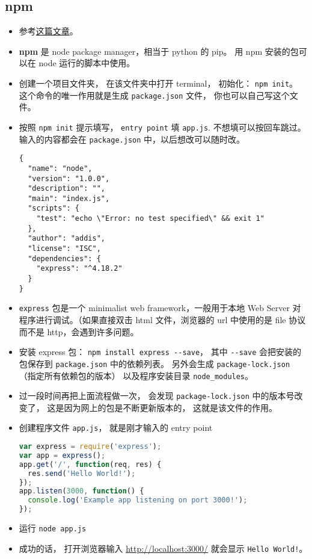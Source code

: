 \subsection{npm}
\begin{itemize}
\item 参考\href{https://medium.com/@adnanrahic/hello-world-app-with-node-js-and-express-c1eb7cfa8a30}{这篇文章}。
\item \textbf{npm} 是 node package manager，相当于 python 的 pip。 用 npm 安装的包可以在 node 运行的脚本中使用。
\item 创建一个项目文件夹， 在该文件夹中打开 terminal， 初始化： \verb|npm init|。 这个命令的唯一作用就是生成 \verb`package.json` 文件， 你也可以自己写这个文件。
\item 按照 \verb|npm init| 提示填写， \verb|entry point| 填 \verb`app.js`. 不想填可以按回车跳过。 输入的内容都会在 \verb|package.json| 中，以后想改可以随时改。
\begin{lstlisting}[language=none,caption=package.json 示例]
{
  "name": "node",
  "version": "1.0.0",
  "description": "",
  "main": "index.js",
  "scripts": {
    "test": "echo \"Error: no test specified\" && exit 1"
  },
  "author": "addis",
  "license": "ISC",
  "dependencies": {
    "express": "^4.18.2"
  }
}
\end{lstlisting}
\item \verb|express| 包是一个 minimalist web framework，一般用于本地 Web Server 对程序进行调试。（如果直接双击 html 文件，浏览器的 url 中使用的是 file 协议而不是 http，会遇到许多问题。
\item 安装 express 包： \verb|npm install express --save|， 其中 \verb|--save| 会把安装的包保存到 \verb|package.json| 中的依赖列表。 另外会生成 \verb|package-lock.json| （指定所有依赖包的版本） 以及程序安装目录 \verb|node_modules|。
\item 过一段时间再把上面流程做一次， 会发现 \verb|package-lock.json| 中的版本号改变了， 这是因为网上的包是不断更新版本的， 这就是该文件的作用。
\item 创建程序文件 \verb|app.js|， 就是刚才输入的 entry point
\begin{lstlisting}[language=js]
var express = require('express');
var app = express();
app.get('/', function(req, res) {
  res.send('Hello World!');
});
app.listen(3000, function() {
  console.log('Example app listening on port 3000!');
});
\end{lstlisting}
\item 运行 \verb|node app.js|
\item 成功的话， 打开浏览器输入 \href{http://localhost:3000/}{http://localhost:3000/} 就会显示 \verb|Hello World!|。
\end{itemize}

